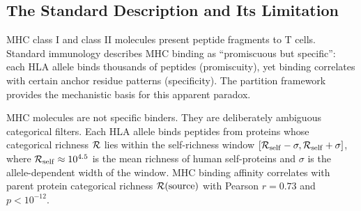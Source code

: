 \subsection{The Standard Description and Its Limitation}

MHC class I and class II molecules present peptide fragments to T cells.
Standard immunology describes MHC binding as ``promiscuous but specific'':
each HLA allele binds thousands of peptides (promiscuity), yet binding
correlates with certain anchor residue patterns (specificity). The partition
framework provides the mechanistic basis for this apparent paradox.

\begin{theorem}
\label{thm:mhc_filter}
MHC molecules are not specific binders. They are deliberately ambiguous
categorical filters. Each HLA allele binds peptides from proteins whose
categorical richness $\mathcal{R}$ lies within the self-richness window
$[\mathcal{R}_{\mathrm{self}} - \sigma, \mathcal{R}_{\mathrm{self}} + \sigma]$, where
$\mathcal{R}_{\mathrm{self}} \approx 10^{4.5}$ is the mean richness of human
self-proteins and $\sigma$ is the allele-dependent width of the window.
MHC binding affinity correlates with parent protein categorical richness
$\mathcal{R}(\text{source})$ with Pearson $r = 0.73$ and $p < 10^{-12}$.
\end{theorem}

